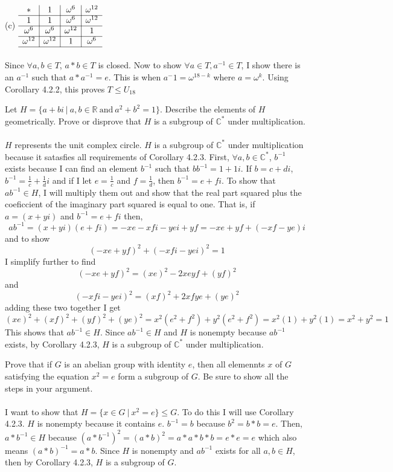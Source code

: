 \documentclass[titlepage]{article}
\newenvironment{problem}[2][Problem]{\begin{trivlist}
\item[\hskip \labelsep {\bfseries #1}\hskip \labelsep {\bfseries #2.}]}{\end{trivlist}}
\begin{document}
\begin{problem}{5}
(c) 
$\begin{array}{c|c|c|c}
* & 1& \omega^{6}& \omega^{12} \\\hline
1 & 1 & \omega^{6} & \omega^{12} \\\hline
\omega^{6} & \omega^{6} & \omega^{12} & 1 \\\hline
\omega^{12} & \omega^{12} & 1 & \omega^{6} \\\hline
\end{array}$ \\ \\
Since $\forall a,b \in T$, $a*b \in T$ is closed. Now to show $\forall a \in T, a^{-1} \in T$, I show there is an $a^{-1}$ such that $a*a^{-1} = e$. This is when $a^-1 = \omega^{18-k}$ where $a=\omega^k$. Using Corollary 4.2.2, this proves $T\leq U_{18}$
\end{problem}

\begin{problem}{6}
Let $H=\{a+bi \ | \ a,b \in \mathbb{R} \ \text{and} \ a^2+b^2 = 1\}$. Describe the elements of $H$ geometrically. Prove or disprove that $H$ is a subgroup of $\mathbb{C}^*$ under multiplication. 
\\ \\
$H$ represents the unit complex circle.
$H$ is a subgroup of $\mathbb{C}^*$ under multiplication because it satasfies all requirements of Corollary 4.2.3. First, $\forall a,b\in \mathbb{C}^* $, $b^{-1}$ exists because I can find an element $b^{-1}$ such that $bb^{-1} = 1+1i$. If $b=c+di$, $b^{-1} = \frac{1}{c} + \frac{1}{d}i$ and if I let $e=\frac{1}{c}$ and $f = \frac{1}{d}$, then $b^{-1} = e+fi$. To show that $ab^{-1} \in H$, I will multiply them out and show that the real part squared plus the coeficcient of the imaginary part squared is equal to one. That is, if $a=(x+yi)$ and $b^{-1} = e+fi$ then,
$$ab^{-1} = (x+yi)(e+fi) = -xe -xfi -yei + yf = -xe + yf + (-xf - ye)i$$ and to show
$$(-xe + yf)^2 + (-xfi - yei)^2 = 1$$ I simplify further to find
$$(-xe + yf)^2 = (xe)^2 -2xeyf + (yf)^2  $$
and
$$ (-xfi - yei)^2= (xf)^2 + 2xfye + (ye)^2$$
adding these two together I get
$$(xe)^2 +  (xf)^2 + (yf)^2 +(ye)^2 = x^2(e^2 +f^2) + y^2(e^2+f^2) = x^2(1) + y^2(1) = x^2+y^2 = 1 $$
This shows that $ab^{-1} \in H$. Since $ab^{-1} \in H$ and $H$ is nonempty because $ab^{-1}$ exists, by Corollary 4.2.3, $H$ is a subgroup of $\mathbb{C}^*$ under multiplication. 
\end{problem}
\begin{problem}{7}
Prove that if $G$ is an abelian group with identity $e$, then all elemennts $x$ of $G$ satisfying the equation $x^2 = e$ form a subgroup of $G$. Be sure to show all the steps in your argument.
\\ \\
I want to show that $H = \{x\in G \ | \ x^2=e\} \leq G$. To do this I will use Corollary 4.2.3.
$H$ is nonempty because it contains $e$. $b^{-1}=b$ because $b^2 = b*b= e$. Then, $a*b^{-1} \in H$ because $(a*b^{-1})^2 = (a*b)^2 = a*a*b*b= e*e = e $ which also means $(a*b)^{-1} = a*b$. Since $H$ is nonempty and $ab^{-1}$ exists for all $a,b\in H$, then by Corollary 4.2.3, $H$ is a subgroup of $G$.
\end{problem}
\end{document}
